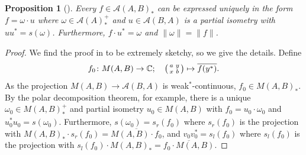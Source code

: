 \documentclass[a4paper,11pt]{article}
\theoremstyle{plain}
\newtheorem{proposition}{Proposition}[section]
\theoremstyle{remark}
\newcommand{\mc}[1]{\mathcal{#1}}
\newenvironment{smat}{\bigl(\begin{smallmatrix}}{\end{smallmatrix}\bigr)}
\begin{document}
\begin{proposition}[{\cite[Corollary~2.8]{GLR_Wstar_categories}}]\label{prop:pd_funcs}
Every $f \in \mc A(A,B)_*$ can be expressed uniquely in the form $f = \omega \cdot u$ where $\omega\in\mc A(A)_*^+$ and $u\in \mc A(B,A)$ is a partial isometry with $uu^* = s(\omega)$.  Furthermore, $f \cdot u^* = \omega$ and $\|\omega\| = \|f\|$.
\end{proposition}
\begin{proof}
We find the proof in \cite{GLR_Wstar_categories} to be extremely sketchy, so we give the details.  Define
\[ f_0 \colon M(A,B) \to \mathbb C; \quad \begin{smat} a & y \\ x & b \end{smat} \mapsto \overline{f(y^*)}. \]
As the projection $M(A,B) \to \mc A(B,A)$ is weak$^*$-continuous, $f_0 \in M(A,B)_*$.  By the polar decomposition theorem, \cite[Theorem~III.4.2]{TakesakiI} for example, there is a unique $\omega_0 \in M(A,B)_*^+$ and partial isometry $u_0 \in M(A,B)$ with $f_0 = u_0 \cdot \omega_0$ and $u_0^* u_0 = s(\omega_0)$.  Furthermore, $s(\omega_0) = s_r(f_0)$ where $s_r(f_0)$ is the projection with $M(A,B)_* \cdot s_r(f_0) = \overline{M(A,B)\cdot f_0}$, and $v_0v_0^* = s_l(f_0)$ where $s_l(f_0)$ is the projection with $s_l(f_0) \cdot M(A,B)_* = \overline{f_0 \cdot M(A,B)}$.


\end{proof}
\end{document}
